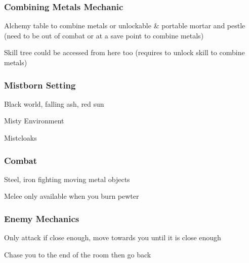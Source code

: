 \documentclass{article}
\begin{document}
\subsubsection{Combining Metals Mechanic}
\begin{description}
\item Alchemy table to combine metals or unlockable \& portable mortar and pestle (need to be out of combat or at a save point to combine metals)
\item Skill tree could be accessed from here too (requires to unlock skill to combine metals)
\end{description}

\subsubsection{Mistborn Setting}
\begin{description}
\item Black world, falling ash, red sun
\item Misty Environment
\item Mistcloaks
\end{description}

\subsubsection{Combat}
\begin{description}
\item Steel, iron fighting moving metal objects
\item Melee only available when you burn pewter
\end{description}

\subsubsection{Enemy Mechanics}
\begin{description}
\item Only attack if close enough, move towards you until it is close enough
\item Chase you to the end of the room then go back
\end{description}
\end{document}
